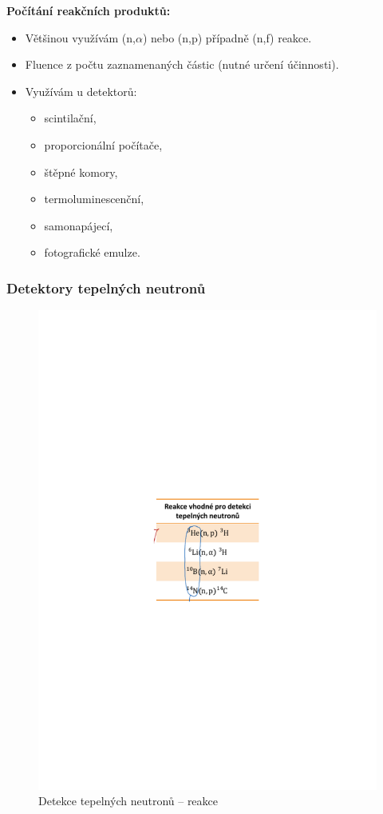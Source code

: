 \textbf{Počítání reakčních produktů:}

\begin{itemize}
    \item Většinou využívám (n,$\alpha$) nebo (n,p) případně (n,f) reakce.
    \item Fluence z počtu zaznamenaných částic (nutné určení účinnosti).
    \item Využívám u detektorů:
    \begin{itemize}
        \item scintilační,
        \item proporcionální počítače,
        \item štěpné komory,
        \item termoluminescenční,
        \item samonapájecí,
        \item fotografické emulze.
    \end{itemize}
\end{itemize}

\subsubsection{Detektory tepelných neutronů}

\begin{figure}[H]
    \centering
    \includegraphics[width=0.4\linewidth, trim={5cm 12cm 5cm 12cm},clip]{img/reakce_tepelne_neutrony.pdf}
    \caption{Detekce tepelných neutronů -- reakce}
\end{figure}

